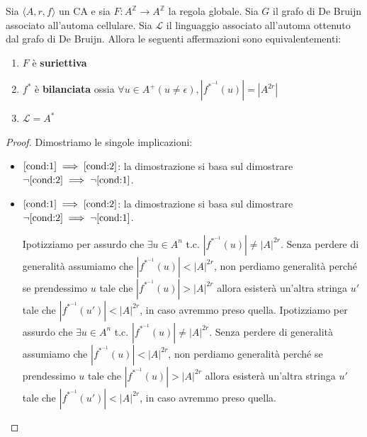 \begin{teorema}
    \label{th:suriettività_CA}
    Sia $\langle A,r,f\rangle$ un CA e sia $F: A^\mathbb{Z}\rightarrow A^\mathbb{Z}$
    la regola globale. Sia $G$ il grafo di De Bruijn associato all'automa cellulare.
    Sia $\mathcal{L}$ il linguaggio associato all'automa ottenuto dal grafo di De Bruijn.
    Allora le seguenti affermazioni sono equivalentementi:
    \begin{enumerate}
        \item \label{cond:1}$F$ è \textbf{suriettiva}
        \item \label{cond:2}$f^\ast$ è \textbf{bilanciata} ossia $\forall u \in A^+ (u\ne \epsilon), |f^{\ast^{-1}}(u)|= |A^{2r}|$
        \item \label{cond:3}$\mathcal{L} = A^\ast$
    \end{enumerate}
    \begin{proof}
        Dimostriamo le singole implicazioni:
        \begin{itemize}
            \item $\ref{cond:1}\implies \ref{cond:2}$: la dimostrazione si basa
                  sul dimostrare $\lnot \ref{cond:2}\implies \lnot \ref{cond:1}$.
            \item $\ref{cond:1}\implies \ref{cond:2}$: la dimostrazione si basa
                  sul dimostrare $\lnot \ref{cond:2}\implies \lnot \ref{cond:1}$.

                  Ipotizziamo per assurdo che $\exists u\in A^n$ t.c. $|f^{\ast^{-1}}(u)|\ne |A|^{2r}$.
                  Senza perdere di generalità assumiamo che $|f^{\ast^{-1}}(u)|< |A|^{2r}$,
                  non perdiamo generalità perché se prendessimo $u$ tale che $|f^{\ast^{-1}}(u)|> |A|^{2r}$
                  allora esisterà un'altra stringa $u'$ tale che $|f^{\ast^{-1}}(u')|< |A|^{2r}$,
                  in caso avremmo preso quella.
                  Ipotizziamo per assurdo che $\exists u\in A^n$ t.c. $|f^{\ast^{-1}}(u)|\ne |A|^{2r}$.
                  Senza perdere di generalità assumiamo che $|f^{\ast^{-1}}(u)|< |A|^{2r}$,
                  non perdiamo generalità perché se prendessimo $u$ tale che $|f^{\ast^{-1}}(u)|> |A|^{2r}$
                  allora esisterà un'altra stringa $u'$ tale che $|f^{\ast^{-1}}(u')|< |A|^{2r}$,
                  in caso avremmo preso quella.


\end{itemize}
\end{proof}
\end{teorema}
